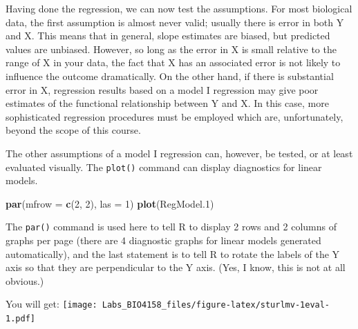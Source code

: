 \documentclass[
  12pt,
]{book}
\newenvironment{Shaded}{\begin{snugshade}}{\end{snugshade}}
\newcommand{\DataTypeTok}[1]{\textcolor[rgb]{0.13,0.29,0.53}{#1}}
\newcommand{\DecValTok}[1]{\textcolor[rgb]{0.00,0.00,0.81}{#1}}
\newcommand{\FloatTok}[1]{\textcolor[rgb]{0.00,0.00,0.81}{#1}}
\newcommand{\KeywordTok}[1]{\textcolor[rgb]{0.13,0.29,0.53}{\textbf{#1}}}
\newcommand{\NormalTok}[1]{#1}
\begin{document}
Having done the regression, we can now test the assumptions.
For most biological data, the first assumption is almost never valid; usually there is error in both Y and X. This means that in general, slope estimates are biased, but predicted values are unbiased. However, so long as the error in X is small relative to the range of X in your data, the fact that X has an associated error is not likely to influence the outcome dramatically. On the other hand, if there is substantial error in X, regression results based on a model I regression may give poor estimates of the functional relationship between Y and X. In this case, more sophisticated regression procedures must be employed which are, unfortunately, beyond the scope of this course.

The other assumptions of a model I regression can, however, be tested, or at least evaluated visually. The \texttt{plot()} command can display diagnostics for linear models.

\begin{Shaded}
\begin{Highlighting}[]
\KeywordTok{par}\NormalTok{(}\DataTypeTok{mfrow =} \KeywordTok{c}\NormalTok{(}\DecValTok{2}\NormalTok{, }\DecValTok{2}\NormalTok{), }\DataTypeTok{las =} \DecValTok{1}\NormalTok{)}
\KeywordTok{plot}\NormalTok{(RegModel}\FloatTok{.1}\NormalTok{)}
\end{Highlighting}
\end{Shaded}

The \texttt{par()} command is used here to tell R to display 2 rows and 2 columns of graphs per page (there are 4 diagnostic graphs for linear models generated automatically), and the last statement is to tell R to rotate the labels of the Y axis so that they are perpendicular to the Y axis. (Yes, I know, this is not at all obvious.)

You will get:
\texttt{[image: Labs\_BIO4158\_files/figure-latex/sturlmv-1eval-1.pdf]}
\end{document}
